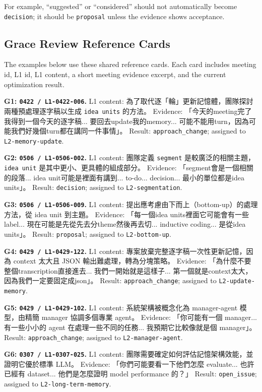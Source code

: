 \documentclass[11pt,a4paper]{article}
\newcommand{\code}[1]{{\footnotesize\texttt{#1}}}
\begin{document}
For example, ``suggested'' or ``considered'' should not automatically become \code{decision}; it should be \code{proposal} unless the evidence shows acceptance.

\subsection{Grace Review Reference Cards}

The examples below use these shared reference cards. Each card includes meeting id, L1 id, L1 content, a short meeting evidence excerpt, and the current optimization result.

\textbf{G1: \code{0422 / L1-0422-006}.} L1 content: 為了取代逐「輪」更新記憶體，團隊探討兩種預處理逐字稿以生成 \code{idea units} 的方法。 Evidence: 「今天的meeting完了我得到一個今天的逐字稿... 要回去update我的memory... 可能不能用turn，因為可能我們好幾個turn都在講同一件事情」。 Result: \code{approach\_change}; assigned to \code{L2-memory-update}.

\textbf{G2: \code{0506 / L1-0506-002}.} L1 content: 團隊定義 \code{segment} 是較廣泛的相關主題，\code{idea unit} 是其中更小、更具體的組成部分。 Evidence: 「segment會是一個相關的段落... idea unit可能是裡面有講到... to-do... decision... 最小的單位都是idea units」。 Result: \code{decision}; assigned to \code{L2-segmentation}.

\textbf{G3: \code{0506 / L1-0506-009}.} L1 content: 提出應考慮由下而上（bottom-up）的處理方法，從 idea unit 到主題。 Evidence: 「每一個idea units裡面它可能會有一些label... 現在可能是先從先去分theme然後再去切... inductive coding... 是從idea units」。 Result: \code{proposal}; assigned to \code{L2-bottom-up}.

\textbf{G4: \code{0429 / L1-0429-122}.} L1 content: 專案放棄完整逐字稿一次性更新記憶，因為 context 太大且 JSON 輸出難處理，轉為分塊策略。 Evidence: 「為什麼不要整個transcription直接進去... 我們一開始就是這樣子... 第一個就是context太大，因為我們一定要固定成json」。 Result: \code{approach\_change}; assigned to \code{L2-update-memory}.

\textbf{G5: \code{0429 / L1-0429-102}.} L1 content: 系統架構被概念化為 manager-agent 模型，由精簡 manager 協調多個專業 agent。 Evidence: 「你可能有一個 manager... 有一些小小的 agent 在處理一些不同的任務... 我預期它比較像就是個 manager」。 Result: \code{approach\_change}; assigned to \code{L2-manager-agent}.

\textbf{G6: \code{0307 / L1-0307-025}.} L1 content: 團隊需要確定如何評估記憶架構效能，並證明它優於標準 LLM。 Evidence: 「你們可能要看一下他們怎麼 evaluate... 也許已經有 dataset... 他們是怎麼證明 model performance 的？」 Result: \code{open\_issue}; assigned to \code{L2-long-term-memory}.
\end{document}
